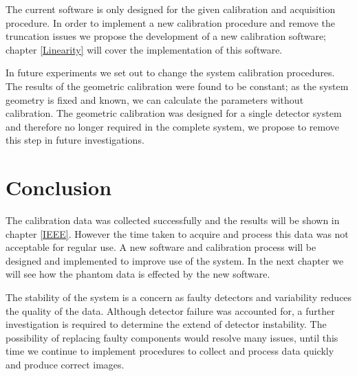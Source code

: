 The current software is only designed for the given calibration and acquisition procedure. In order to implement a new calibration procedure and remove the truncation issues we propose the development of a new calibration software; chapter \ref{Linearity} will cover the implementation of this software. 

In future experiments we set out to change the system calibration procedures. The results of the geometric calibration were found to be constant; as the system geometry is fixed and known, we can calculate the parameters without calibration. The geometric calibration was designed for a single detector system and therefore no longer required in the complete system, we propose to remove this step in future investigations.

\section{Conclusion}
The calibration data was collected successfully and the results will be shown in chapter \ref{IEEE}. However the time taken to acquire and process this data was not acceptable for regular use. A new software and calibration process will be designed and implemented to improve use of the system. In the next chapter we will see how the phantom data is effected by the new software.

The stability of the system is a concern as faulty detectors and variability reduces the quality of the data. Although detector failure was accounted for, a further investigation is required to determine the extend of detector instability. The possibility of replacing faulty components would resolve many issues, until this time we continue to implement procedures to collect and process data quickly and  produce correct images.
